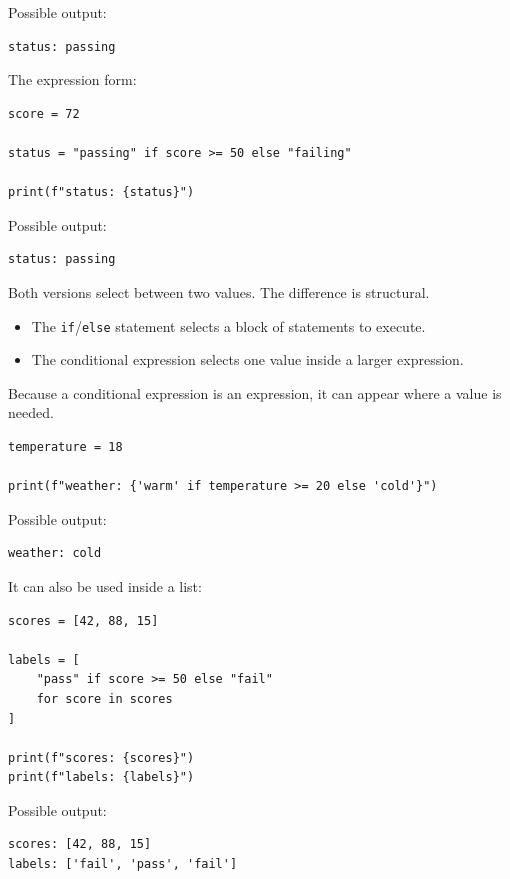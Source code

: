 Possible output:

\begin{verbatim}
status: passing
\end{verbatim}

The expression form:

\begin{verbatim}
score = 72

status = "passing" if score >= 50 else "failing"

print(f"status: {status}")
\end{verbatim}

Possible output:

\begin{verbatim}
status: passing
\end{verbatim}

Both versions select between two values. The difference is structural.

\begin{itemize}
    \item The \texttt{if}/\texttt{else} statement selects a block of statements to execute.
    \item The conditional expression selects one value inside a larger expression.
\end{itemize}

Because a conditional expression is an expression, it can appear where a value is needed.

\begin{verbatim}
temperature = 18

print(f"weather: {'warm' if temperature >= 20 else 'cold'}")
\end{verbatim}

Possible output:

\begin{verbatim}
weather: cold
\end{verbatim}

It can also be used inside a list:

\begin{verbatim}
scores = [42, 88, 15]

labels = [
    "pass" if score >= 50 else "fail"
    for score in scores
]

print(f"scores: {scores}")
print(f"labels: {labels}")
\end{verbatim}

Possible output:

\begin{verbatim}
scores: [42, 88, 15]
labels: ['fail', 'pass', 'fail']
\end{verbatim}

